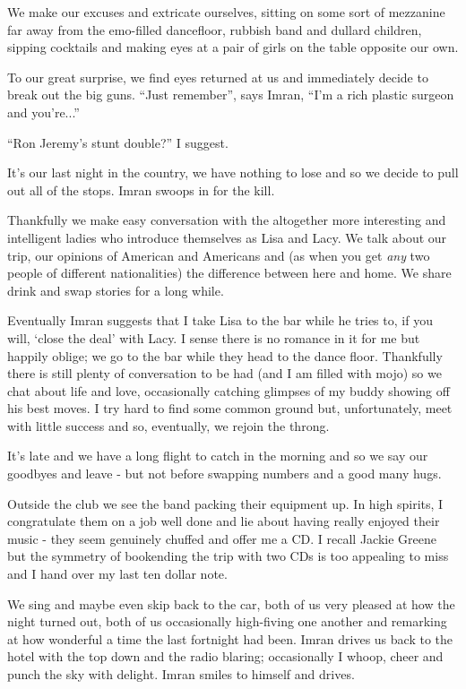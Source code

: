 \documentclass[a5paper,titlepage,11pt,draft]{book}
\begin{document}
We make our excuses and extricate ourselves, sitting on some sort of mezzanine far away from the emo-filled dancefloor, rubbish band and dullard children, sipping cocktails and making eyes at a pair of girls on the table opposite our own.

To our great surprise, we find eyes returned at us and immediately decide to break out the big guns.  ``Just remember'', says Imran, ``I'm a rich plastic surgeon and you're...''

``Ron Jeremy's stunt double?'' I suggest.

It's our last night in the country, we have nothing to lose and so we decide to pull out all of the stops.  Imran swoops in for the kill.

Thankfully we make easy conversation with the altogether more interesting and intelligent ladies who introduce themselves as Lisa and Lacy.  We talk about our trip, our opinions of American and Americans and (as when you get \emph{any} two people of different nationalities) the difference between here and home.  We share drink and swap stories for a long while.

Eventually Imran suggests that I take Lisa to the bar while he tries to, if you will, `close the deal' with Lacy.  I sense there is no romance in it for me but happily oblige; we go to the bar while they head to the dance floor.  Thankfully there is still plenty of conversation to be had (and I am filled with mojo) so we chat about life and love, occasionally catching glimpses of my buddy showing off his best moves.  I try hard to find some common ground but, unfortunately, meet with little success and so, eventually, we rejoin the throng.

It's late and we have a long flight to catch in the morning and so we say our goodbyes and leave - but not before swapping numbers and a good many hugs.

Outside the club we see the band packing their equipment up.  In high spirits, I congratulate them on a job well done and lie about having really enjoyed their music - they seem genuinely chuffed and offer me a CD.  I recall Jackie Greene but the symmetry of bookending the trip with two CDs is too appealing to miss and I hand over my last ten dollar note.

We sing and maybe even skip back to the car, both of us very pleased at how the night turned out, both of us occasionally high-fiving one another and remarking at how wonderful a time the last fortnight had been.  Imran drives us back to the hotel with the top down and the radio blaring; occasionally I whoop, cheer and punch the sky with delight.  Imran smiles to himself and drives.
\end{document}
